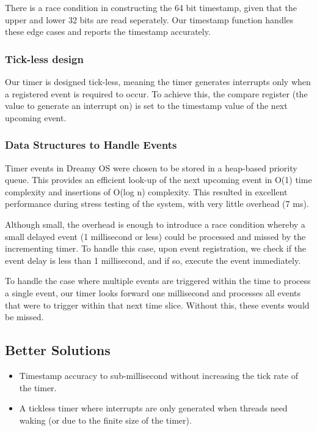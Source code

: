 \documentclass[runningheads,a4paper]{llncs}
\begin{document}
There is a race condition in constructing the 64 bit timestamp, given that the upper and lower 32 bits are read seperately. Our timestamp function handles these edge cases and reports the timestamp accurately.

\subsubsection{Tick-less design}
Our timer is designed tick-less, meaning the timer generates interrupts only when a registered event is required to occur. To achieve this, the compare register (the value to generate an interrupt on) is set to the timestamp value of the next upcoming event.

\subsubsection{Data Structures to Handle Events}
Timer events in Dreamy OS were chosen to be stored in a heap-based priority queue. This provides an efficient look-up of the next upcoming event in O(1) time complexity and insertions of O(log n) complexity. This resulted in excellent performance during stress testing of the system, with very little overhead (7 ms).

Although small, the overhead is enough to introduce a race condition whereby a small delayed event (1 millisecond or less) could be processed and missed by the incrementing timer. To handle this case, upon event registration, we check if the event delay is less than 1 millisecond, and if so, execute the event immediately.

To handle the case where multiple events are triggered within the time to process a single event, our timer looks forward one millisecond and processes all events that were to trigger within that next time slice. Without this, these events would be missed.

\subsection{Better Solutions}

\begin{itemize}[label={\checkmark}]
  \item Timestamp accuracy to sub-millisecond without increasing the tick rate of the timer.
  \item A tickless timer where interrupts are only generated when threads need waking (or due to the finite size of the timer).
\end{itemize}
\end{document}
